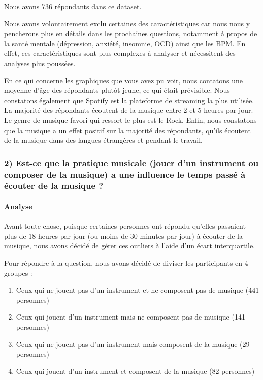 \documentclass[
]{article}
\providecommand{\tightlist}{%
  \setlength{\itemsep}{0pt}\setlength{\parskip}{0pt}}
\begin{document}
Nous avons 736 répondants dans ce dataset.

Nous avons volontairement exclu certaines des caractéristiques car nous
nous y pencherons plus en détails dans les prochaines questions,
notamment à propos de la santé mentale (dépression, anxiété, insomnie,
OCD) ainsi que les BPM. En effet, ces caractéristiques sont plus
complexes à analyser et nécessitent des analyses plus poussées.

En ce qui concerne les graphiques que vous avez pu voir, nous contatons
une moyenne d'âge des répondants plutôt jeune, ce qui était prévisible.
Nous constatons également que Spotify est la plateforme de streaming la
plus utilisée. La majorité des répondants écoutent de la musique entre 2
et 5 heures par jour. Le genre de musique favori qui ressort le plus est
le Rock. Enfin, nous constatons que la musique a un effet positif sur la
majorité des répondants, qu'ils écoutent de la musique dans des langues
étrangères et pendant le travail.

\hypertarget{est-ce-que-la-pratique-musicale-jouer-dun-instrument-ou-composer-de-la-musique-a-une-influence-le-temps-passuxe9-uxe0-uxe9couter-de-la-musique}{%
\subsubsection{2) Est-ce que la pratique musicale (jouer d'un instrument
ou composer de la musique) a une influence le temps passé à écouter de
la musique
?}\label{est-ce-que-la-pratique-musicale-jouer-dun-instrument-ou-composer-de-la-musique-a-une-influence-le-temps-passuxe9-uxe0-uxe9couter-de-la-musique}}

\hypertarget{analyse-2}{%
\paragraph{\texorpdfstring{\textbf{Analyse}}{Analyse}}\label{analyse-2}}

Avant toute chose, puisque certaines personnes ont répondu qu'elles
passaient plus de 18 heures par jour (ou moins de 30 minutes par jour) à
écouter de la musique, nous avons décidé de gérer ces outliers à l'aide
d'un écart interquartile.

Pour répondre à la question, nous avons décidé de diviser les
participants en 4 groupes :

\begin{enumerate}
\def\labelenumi{\arabic{enumi}.}
\tightlist
\item
  Ceux qui ne jouent pas d'un instrument et ne composent pas de musique
  (441 personnes)
\item
  Ceux qui jouent d'un instrument mais ne composent pas de musique (141
  personnes)
\item
  Ceux qui ne jouent pas d'un instrument mais composent de la musique
  (29 personnes)
\item
  Ceux qui jouent d'un instrument et composent de la musique (82
  personnes)
\end{enumerate}
\end{document}
